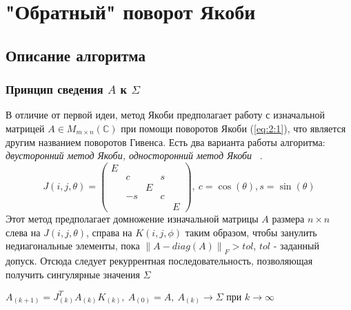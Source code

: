 \newpage
\section{"Обратный" поворот Якоби}

\subsection{Описание алгоритма}

\subsubsection{Принцип сведения $A$ к $\Sigma$}
В отличие от первой идеи, метод Якоби предполагает работу с изначальной матрицей $A\in M_{m\times n}(\mathbb{C})$ при помощи поворотов Якоби (\ref{eq:2:1}), что является другим названием поворотов Гивенса. Есть два варианта работы алгоритма:\textit{ двусторонний метод Якоби, односторонний метод Якоби} ~\cite{Dongarra2018}.
\begin{equation} \label{eq:2:1}
    J(i,j,\theta) = 
    \begin{pmatrix}E&&&&\\
        &c&&s\\
        &&E&&\\
        &-s&&c\\
        &&&&E
    \end{pmatrix},\
    c = \cos(\theta), s =\sin(\theta) 
\end{equation}
Этот метод предполагает домножение изначальной матрицы $A$ размера $n\times n \ $ слева на $J(i,j,\theta)$, справа на $K(i,j,\phi)$ таким образом, чтобы занулить недиагональные элементы, пока $\left\| A - diag(A) \right\|_F > tol$, $tol$ - заданный допуск. 
Отсюда следует рекуррентная последовательность, позволяющая получить сингулярные значения $\Sigma$
\begin{center}
    $A_{(k+1)} = J^T_{(k)}A_{(k)}K_{(k)}, \ A_{(0)}= A, \ A_{(k)}\longrightarrow\Sigma \text{ при } k\to\infty$
\end{center}

